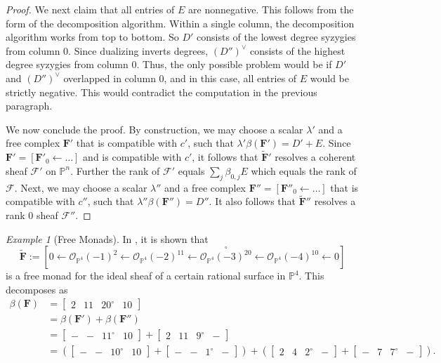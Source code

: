\documentclass[12pt]{amsart}
\theoremstyle{definition}
\theoremstyle{remark}
\newtheorem{example}[lemma]{Example}
\newcommand{\PP}{\mathbb{P}}
\newcommand{\cc}{c}
\newcommand{\cO}{\mathcal{O}}
\newcommand{\cF}{\mathcal{F}}
\newcommand{\FF}{\mathbf{F}}
\newcommand{\zp}{\circ}
\begin{document}
\begin{proof}
We next claim that all entries of $E$ are nonnegative.  This follows from the form of the decomposition algorithm.  Within a single column, the decomposition algorithm works from top to bottom.  So $D'$ consists of the lowest degree syzygies from column $0$.  Since dualizing inverts degrees, $(D'')^\vee$ consists of the highest degree syzygies from column $0$.  Thus, the only possible problem would be if $D'$ and $(D'')^\vee$ overlapped in column $0$, and in this case, all entries of $E$ would be strictly negative.  This would contradict the computation in the previous paragraph.

We now conclude the proof.  By construction, we may choose a scalar $\lambda'$ and a free complex $\FF'$ that is compatible with $\cc'$, such that $\lambda'\beta(\FF')=D'+E$.  Since $\FF'=[\FF'_0\gets \dots]$ and is compatible with $\cc'$, it follows that $\widetilde{\FF}'$ resolves a coherent sheaf $\cF'$ on $\PP^n$.  Further the rank of $\cF'$ equals $\sum_{j} \beta_{0,j} E$ which equals the rank of $\cF$.  Next, we may choose a scalar $\lambda''$ and a free complex $\FF''=[\FF''_0\gets \dots]$ that is compatible with $\cc''$, such that $\lambda''\beta(\FF'')=D''$.  It also follows that $\widetilde{\FF}''$ resolves a rank $0$ sheaf $\cF''$.
\end{proof}

\begin{example}[Free Monads]\label{ex:monads}
In \cite[Example 8.2]{eis-floy-schrey}, it is shown that
\[
\widetilde{\FF}:=\left[0\gets \cO_{\PP^4}(-1)^2 \gets  \cO_{\PP^4}(-2)^{11}\gets \overset{\zp}{\cO_{\PP^4}(-3)^{20}}\gets \cO_{\PP^4}(-4)^{10}\gets 0 \right]
\]
is a free monad for the ideal sheaf of a certain rational surface in $\PP^4$.  This decomposes as
\begin{align*}
\beta(\FF)&=
\begin{bmatrix}
2&11&20^\zp&10
\end{bmatrix}
\\
&=\beta(\FF')+\beta(\FF'')
\\
&=
\begin{bmatrix}
-&-&11^\zp&10
\end{bmatrix}
+
\begin{bmatrix}
2&11&9^\zp&-
\end{bmatrix}
\\
&=
\left(
\begin{bmatrix}
-&-&10^\zp&10
\end{bmatrix}
+
\begin{bmatrix}
-&-&1^\zp&-
\end{bmatrix}
\right)
+
\left( \begin{bmatrix}
2&4&2^\zp&-
\end{bmatrix}
+
\begin{bmatrix}
-&7&7^\zp&-
\end{bmatrix}
\right).
\end{align*}
\end{example}
\end{document}
